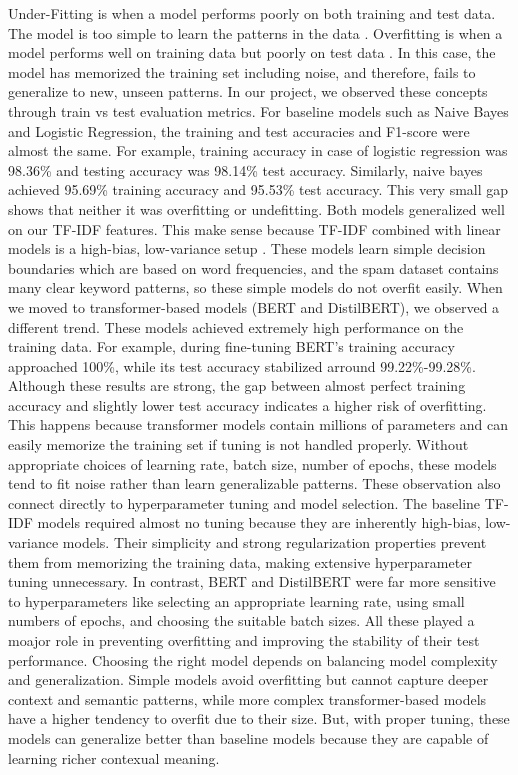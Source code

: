 \documentclass[11pt]{article}
\begin{document}
Under-Fitting is when a model performs poorly on both training and test data. The model is too simple to learn the patterns in the data \cite{hastie2009elements}. Overfitting is when a model performs well on training data but poorly on test data \cite{goodfellow2016deep}. In this case, the model has memorized the training set including noise, and therefore, fails to generalize to new, unseen patterns. In our project, we observed these concepts through train vs test evaluation metrics. For baseline models such as Naive Bayes and Logistic Regression, the training and test accuracies and F1-score were almost the same. For example, training accuracy in case of logistic regression was 98.36\% and testing accuracy was 98.14\% test accuracy. Similarly, naive bayes achieved 95.69\% training accuracy and 95.53\% test accuracy. This very small gap shows that neither it was overfitting or undefitting. Both models generalized well on our TF-IDF features. This make sense because TF-IDF combined with linear models is a high-bias, low-variance setup \cite{hastie2009elements}. These models learn simple decision boundaries which are based on word frequencies, and the spam dataset contains many clear keyword patterns, so these simple models do not overfit easily. When we moved to transformer-based models (BERT and DistilBERT), we observed a different trend. These models achieved extremely high performance on the training data. For example, during fine-tuning BERT's training accuracy approached 100\%, while its test accuracy stabilized arround 99.22\%-99.28\%. Although these results are strong, the gap between almost perfect training accuracy and slightly lower test accuracy indicates a higher risk of overfitting. This happens because transformer models contain millions of parameters and can easily memorize the training set if tuning is not handled properly. Without appropriate choices of learning rate, batch size, number of epochs, these models tend to fit noise rather than learn generalizable patterns. These observation also connect directly to hyperparameter tuning and model selection. The baseline TF-IDF models required almost no tuning because they are inherently high-bias, low-variance models. Their simplicity and strong regularization properties prevent them from memorizing the training data, making extensive hyperparameter tuning unnecessary. In contrast, BERT and DistilBERT were far more sensitive to hyperparameters like selecting an appropriate learning rate, using small numbers of epochs, and choosing the suitable batch sizes. All these played a moajor role in preventing overfitting and improving the stability of their test performance. Choosing the right model depends on balancing model complexity and generalization. Simple models avoid overfitting but cannot capture deeper context and semantic patterns, while more complex transformer-based models have a higher tendency to overfit due to their size. But, with proper tuning, these models can generalize better than baseline models because they are capable of learning richer contexual meaning.
\end{document}
